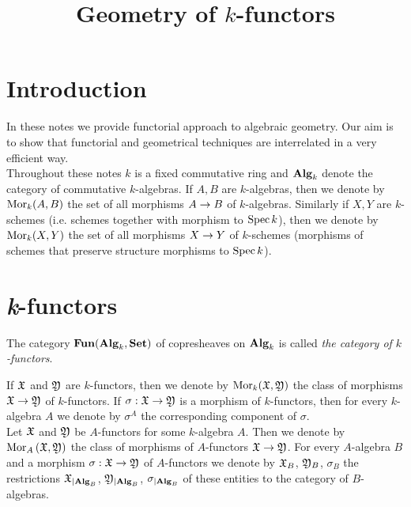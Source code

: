 



\title{Geometry of $k$-functors}
\date{}
\maketitle

\section{Introduction}
\noindent
In these notes we provide functorial approach to algebraic geometry. Our aim is to show that functorial and geometrical techniques are interrelated in a very efficient way.\\
Throughout these notes $k$ is a fixed commutative ring and $\mathbf{Alg}_k$ denote the category of commutative $k$-algebras. If $A, B$ are $k$-algebras, then we denote by $\mathrm{Mor}_k(A, B)$ the set of all morphisms $A\rightarrow B$ of $k$-algebras. Similarly if $X, Y$ are $k$-schemes (i.e. schemes together with morphism to $\mathrm{Spec}\, k$), then we denote by $\mathrm{Mor}_k(X,Y)$ the set of all morphisms $X\rightarrow Y$ of $k$-schemes (morphisms of schemes that preserve structure morphisms to $\mathrm{Spec}\, k$).

\section{\textit{k}-functors}

\begin{definition}
The category $\mathbf{Fun}(\mathbf{Alg}_k,\mathbf{Set})$ of copresheaves on $\mathbf{Alg}_k$ is called \textit{the category of $k$-functors}.
\end{definition}
\noindent
If ${\mathfrak X}$ and ${\mathfrak Y}$ are $k$-functors, then we denote by $\mathrm{Mor}_k({\mathfrak X},{\mathfrak Y})$ the class of morphisms ${\mathfrak X}\rightarrow {\mathfrak Y}$ of $k$-functors. If $\sigma:{\mathfrak X}\rightarrow {\mathfrak Y}$ is a morphism of $k$-functors, then for every $k$-algebra $A$ we denote by $\sigma^A$ the corresponding component of $\sigma$.\\
Let ${\mathfrak X}$ and ${\mathfrak Y}$ be $A$-functors for some $k$-algebra $A$. Then we denote by $\mathrm{Mor}_A\left({\mathfrak X},{\mathfrak Y}\right)$ the class of morphisms of $A$-functors ${\mathfrak X}\rightarrow {\mathfrak Y}$. For every $A$-algebra $B$ and a morphism $\sigma:{\mathfrak X}\rightarrow {\mathfrak Y}$ of $A$-functors we denote by ${\mathfrak X}_{B}$, ${\mathfrak Y}_{B}$, $\sigma_{B}$ the restrictions ${\mathfrak X}_{\mid \mathbf{Alg}_B}$, ${\mathfrak Y}_{\mid \mathbf{Alg}_B}$, $\sigma_{\mid \mathbf{Alg}_B}$ of these entities to the category of $B$-algebras. 

